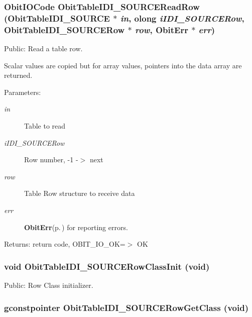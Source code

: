 \subsubsection{\setlength{\rightskip}{0pt plus 5cm}Obit\-IOCode Obit\-Table\-IDI\_\-SOURCERead\-Row ({\bf Obit\-Table\-IDI\_\-SOURCE} $\ast$ {\em in}, {\bf olong} {\em i\-IDI\_\-SOURCERow}, {\bf Obit\-Table\-IDI\_\-SOURCERow} $\ast$ {\em row}, {\bf Obit\-Err} $\ast$ {\em err})}\label{ObitTableIDI__SOURCE_8h_a18}


Public: Read a table row. 

Scalar values are copied but for array values, pointers into the data array are returned. \begin{Desc}
\item[Parameters:]
\begin{description}
\item[{\em in}]Table to read \item[{\em i\-IDI\_\-SOURCERow}]Row number, -1 -$>$ next \item[{\em row}]Table Row structure to receive data \item[{\em err}]{\bf Obit\-Err}{\rm (p.\,\pageref{structObitErr})} for reporting errors. \end{description}
\end{Desc}
\begin{Desc}
\item[Returns:]return code, OBIT\_\-IO\_\-OK=$>$ OK \end{Desc}
\subsubsection{\setlength{\rightskip}{0pt plus 5cm}void Obit\-Table\-IDI\_\-SOURCERow\-Class\-Init (void)}\label{ObitTableIDI__SOURCE_8h_a7}


Public: Row Class initializer. 

\subsubsection{\setlength{\rightskip}{0pt plus 5cm}gconstpointer Obit\-Table\-IDI\_\-SOURCERow\-Get\-Class (void)}\label{ObitTableIDI__SOURCE_8h_a9}


